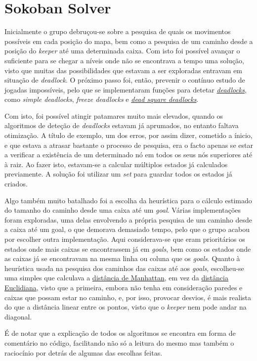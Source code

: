 \documentclass[10pt,portuguese]{article}
\begin{document}
\section{Sokoban Solver}
\par Inicialmente o grupo debruçou-se sobre a pesquisa de quais os movimentos possíveis em cada posição do mapa, bem como a pesquisa de um caminho desde a posição do \textit{keeper} até uma determinada caixa. Com isto foi possível avançar o suficiente para se chegar a níveis onde não se encontrava a tempo uma solução, visto que muitas das possibilidades que estavam a ser exploradas entravam em situação de \textit{deadlock}. O próximo passo foi, então, prevenir o contínuo estudo de jogadas impossíveis, pelo que se implementaram funções para detetar \href{http://sokobano.de/wiki/index.php?title=How_to_detect_deadlocks}{\textit{deadlocks}}, como \textit{simple deadlocks}, \textit{freeze deadlocks} e \href{http://www.sokobano.de/wiki/index.php?title=Deadlocks}{\textit{dead square deadlocks}}. 
\par Com isto, foi possível atingir patamares muito mais elevados, quando os algoritmos de deteção de \textit{deadlocks} estavam já aprumados, no entanto faltava otimização. A título de exemplo, um dos erros, por assim dizer, cometido a ínicio, e que estava a atrasar bastante o processo de pesquisa, era o facto apenas se estar a verificar a existência de um determinado nó em todos os seus nós superiores até à raiz. Ao fazer isto, estavam-se a calcular múltiplos estados já calculados previamente. A solução foi utilizar um \textit{set} para guardar todos os estados já criados.
\par Algo também muito batalhado foi a escolha da heurística para o cálculo estimado do tamanho do caminho desde uma caixa até um \textit{goal}. Várias implementações foram exploradas, uma delas envolvendo a própria pesquisa de um caminho desde a caixa até um goal, o que demorava demasiado tempo, pelo que o grupo acabou por escolher outra implementação. Aqui considerava-se que eram prioritários os estados onde mais caixas se encontrassem já em \textit{goals}, bem como os estados onde as caixas já se encontravam na mesma linha ou coluna que os \textit{goals}. Quanto à heurística usada na pesquisa dos caminhos das caixas até aos \textit{goals}, escolheu-se uma simples que calculava a \href{https://pt.wikipedia.org/wiki/Geometria_pombalina}{distância de Manhattan}, em vez da \href{https://pt.wikipedia.org/wiki/Dist\%C3\%A2ncia_euclidiana}{distância Euclidiana}, visto que a primeira, embora não tenha em consideração paredes e caixas que possam estar no caminho, e, por isso, provocar desvios, é mais realista do que a distância linear entre os pontos, visto que o \textit{keeper} nem pode andar na diagonal.
\par É de notar que a explicação de todos os algoritmos se encontra em forma de comentário no código, facilitando não só a leitura do mesmo mas também o raciocínio por detrás de algumas das escolhas feitas.
\end{document}
